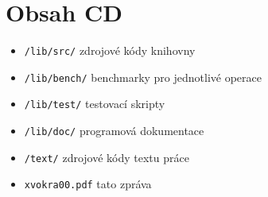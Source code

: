 \chapter{Obsah CD}
\begin{itemize}
	\item{\texttt{/lib/src/} zdrojové kódy knihovny}
	\item{\texttt{/lib/bench/} benchmarky pro jednotlivé operace}
	\item{\texttt{/lib/test/} testovací skripty}
	\item{\texttt{/lib/doc/} programová dokumentace}
	\item{\texttt{/text/} zdrojové kódy textu práce}
	\item{\texttt{xvokra00.pdf} tato zpráva}
\end{itemize}


